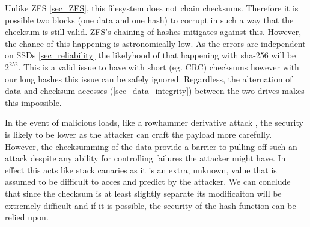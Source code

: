         Unlike ZFS \ref{sec_ZFS}, this filesystem does not chain checksums.
        Therefore it is possible two blocks (one data and one hash) to corrupt
        in such a way that the checksum is still valid. ZFS's chaining of
        hashes mitigates against this. However, the chance of this happening is
        astronomically low. As the errors are independent on SSDs
        \ref{sec_reliability} the likelyhood of that happening with sha-256
        will be $2^{252}$. This is a valid issue to have with short (eg. CRC)
        checksums however with our long hashes this issue can be safely
        ignored. Regardless, the alternation of data and checksum accesses
        (\ref{sec_data_integrity}) between the two drives makes this
        impossible.

        In the event of malicious loads, like a rowhammer derivative attack
        \cite{ssd_rowhammer}, the security is likely to be lower as the
        attacker can craft the payload more carefully. However, the
        checksumming of the data provide a barrier to pulling off such an
        attack despite any ability for controlling failures the attacker might
        have. In effect this acts like stack canaries \cite{canaries} as it is
        an extra, unknown, value that is assumed to be difficult to acces and
        predict by the attacker. We can conclude that since the checksum is at
        least slightly separate its modificaiton will be extremely difficult
        and if it is possible, the security of the hash function can be relied
        upon.



